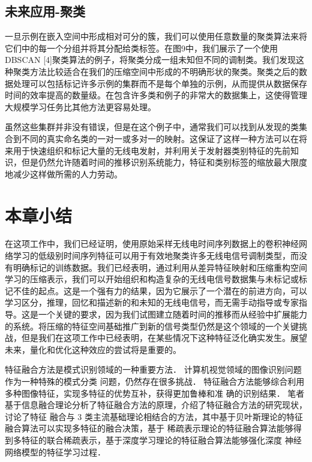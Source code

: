 \subsection{未来应用-聚类}
一旦示例在嵌入空间中形成相对可分的簇，我们可以使用任意数量的聚类算法来将它们中的每一个分组并将其分配给类标签。在图9中，我们展示了一个使用DBSCAN [4]聚类算法的例子，将聚类分成一组未知但不同的调制类。我们发现这种聚类方法比较适合在我们的压缩空间中形成的不明确形状的聚类。聚类之后的数据处理可以包括标记许多示例的集群而不是每个单独的示例，从而提供从数据保存时间的效率提高的数量级。在包含许多类和例子的非常大的数据集上，这使得管理大规模学习任务比其他方法更容易处理。\par
虽然这些集群并非没有错误，但是在这个例子中，通常我们可以找到从发现的类集合到不同的真实命名类的一对一或多对一的映射。这保证了这样一种方法可以在将来用于快速组织和标记大量的无线电发射，并利用关于发射器类别特征的先前知识，但是仍然允许随着时间的推移识别系统能力，特征和类别标签的缩放最大限度地减少这样做所需的人力劳动。\par


\section{本章小结}


在这项工作中，我们已经证明，使用原始采样无线电时间序列数据上的卷积神经网络学习的低级别时间序列特征可以用于有效地聚类许多无线电信号调制类型，而没有明确标记的训练数据。我们已经表明，通过利用从差异特征映射和压缩重构空间学习的压缩表示，我们可以开始组织和构造复杂的无线电信号数据集与未标记或标记不佳的起点。这是一个强有力的结果，因为它展示了一个潜在的前进方向，可以学习区分，推理，回忆和描述新的和未知的无线电信号，而无需手动指导或专家指导。这是一个关键的要求，因为我们试图建立随着时间的推移而从经验中扩展能力的系统。将压缩的特征空间基础推广到新的信号类型仍然是这个领域的一个关键挑战，但是我们在这项工作中已经表明，在某些情况下这种特征泛化确实发生。展望未来，量化和优化这种效应的尝试将是重要的。\par

特征融合方法是模式识别领域的一种重要方法． 计算机视觉领域的图像识别问题作为一种特殊的模式分类
问题，仍然存在很多挑战． 特征融合方法能够综合利用多种图像特征，实现多特征的优势互补，获得更加鲁棒和准
确的识别结果． 笔者基于信息融合理论分析了特征融合方法的原理，介绍了特征融合方法的研究现状，讨论了特征
融合与 3 类主流基础理论相结合的方法，其中基于贝叶斯理论的特征融合算法可以实现多特征的融合决策，基于
稀疏表示理论的特征融合算法能够得到多特征的联合稀疏表示，基于深度学习理论的特征融合算法能够强化深度
神经网络模型的特征学习过程．\par
